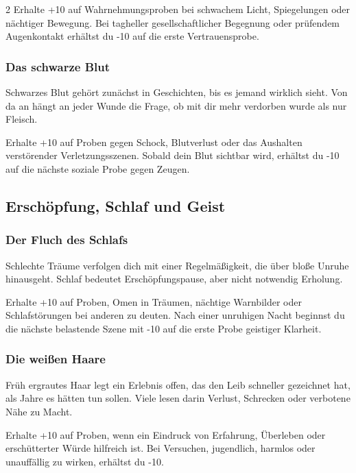 {\begin{multicols*}{2}
        \malspielwertebox
        {Erhalte +10 auf Wahrnehmungsproben bei schwachem Licht, Spiegelungen oder nächtiger Bewegung.}
        {Bei tagheller gesellschaftlicher Begegnung oder prüfendem Augenkontakt erhältst du -10 auf die erste Vertrauensprobe.}

        \subsubsection*{Das schwarze Blut}
        Schwarzes Blut gehört zunächst in Geschichten, bis es jemand wirklich sieht. Von da an hängt an jeder Wunde die Frage, ob mit dir mehr verdorben wurde als nur Fleisch.

        \malspielwertebox
        {Erhalte +10 auf Proben gegen Schock, Blutverlust oder das Aushalten verstörender Verletzungsszenen.}
        {Sobald dein Blut sichtbar wird, erhältst du -10 auf die nächste soziale Probe gegen Zeugen.}

        \subsection{Erschöpfung, Schlaf und Geist}\label{subsec:male-geist}

        \subsubsection*{Der Fluch des Schlafs}
        Schlechte Träume verfolgen dich mit einer Regelmäßigkeit, die über bloße Unruhe hinausgeht. Schlaf bedeutet Erschöpfungspause, aber nicht notwendig Erholung.

        \malspielwertebox
        {Erhalte +10 auf Proben, Omen in Träumen, nächtige Warnbilder oder Schlafstörungen bei anderen zu deuten.}
        {Nach einer unruhigen Nacht beginnst du die nächste belastende Szene mit -10 auf die erste Probe geistiger Klarheit.}

        \subsubsection*{Die weißen Haare}
        Früh ergrautes Haar legt ein Erlebnis offen, das den Leib schneller gezeichnet hat, als Jahre es hätten tun sollen. Viele lesen darin Verlust, Schrecken oder verbotene Nähe zu Macht.

        \malspielwertebox
        {Erhalte +10 auf Proben, wenn ein Eindruck von Erfahrung, Überleben oder erschütterter Würde hilfreich ist.}
        {Bei Versuchen, jugendlich, harmlos oder unauffällig zu wirken, erhältst du -10.}


\end{multicols*}}
